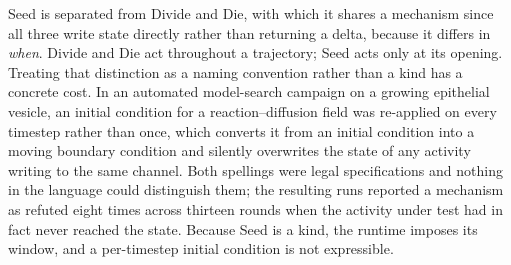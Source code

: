 \documentclass[11pt]{article}
\begin{document}
Seed is separated from Divide and Die, with which it shares a mechanism since all three
write state directly rather than returning a delta, because it differs in \emph{when}.
Divide and Die act throughout a trajectory; Seed acts only at its opening. Treating
that distinction as a naming convention rather than a kind has a concrete cost. In an
automated model-search campaign on a growing epithelial vesicle, an initial condition
for a reaction--diffusion field was re-applied on every timestep rather than once,
which converts it from an initial condition into a moving boundary condition and
silently overwrites the state of any activity writing to the same channel. Both
spellings were legal specifications and nothing in the language could distinguish
them; the resulting runs reported a mechanism as refuted eight times across thirteen
rounds when the activity under test had in fact never reached the state. Because Seed
is a kind, the runtime imposes its window, and a per-timestep initial condition is not
expressible.
\end{document}
